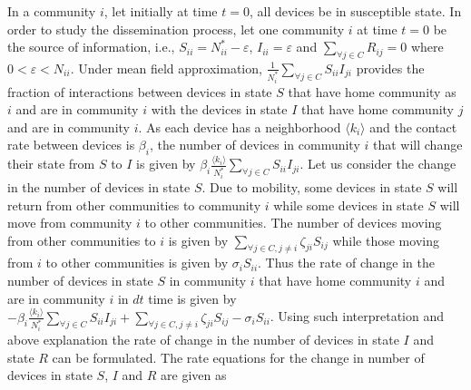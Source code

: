 \documentclass[review]{elsarticle}
\begin{document}
In a community $i$, let initially at time $t=0$, all devices be in susceptible state. In order to study the dissemination process, let one community $i$ at time $t=0$ be the source of information, i.e., $S_{ii}=N_{ii}^{*}-\varepsilon$, $I_{ii}=\varepsilon$ and $\displaystyle \sum_{\forall j\in C}R_{ij}=0$ where $0<\varepsilon<N_{ii}$. Under mean field approximation, $\displaystyle \frac{1}{N_{i}^{*}}\sum_{\forall j \in C}S_{ii}I_{ji}$ provides the fraction of interactions between devices in state $S$ that have home community as $i$ and are in community $i$ with the devices in state $I$ that have home community $j$ and are in community $i$. As each device has a neighborhood $\langle k_{i}\rangle$ and the contact rate between devices is $\beta_i$, the number of devices in community $i$ that will change their state from $S$ to $I$ is given by $\displaystyle \beta_{i}\frac{\langle k_{i} \rangle}{N_{i}^{*}}\sum_{\forall j \in C}S_{ii}I_{ji}$. Let us consider the change in the number of devices in state $S$. Due to mobility, some devices in state $S$ will return from other communities to community $i$ while some devices in state $S$ will move from community $i$ to other communities. The number of devices moving from other communities to $i$ is given by $\displaystyle \sum_{\forall j\in C, j\neq i}\zeta_{ji}S_{ij}$ while those moving from $i$ to other communities is given by $ \sigma_{i}S_{ii}$. Thus the rate of change in the number of devices in state $S$ in community $i$ that have home community $i$ and are in community $i$ in $dt$ time is given by $\displaystyle -\beta_{i}\frac{\langle k_{i} \rangle}{N_{i}^{*}}\sum_{\forall j \in C}S_{ii}I_{ji}+\sum_{\forall j\in C, j\neq i}\zeta_{ji}S_{ij} - \sigma_{i}S_{ii}$. Using such interpretation and above explanation the rate of change in the number of devices in state $I$ and state $R$ can be formulated. The rate equations for the change in number of devices in state $S$, $I$ and $R$ are given as
\end{document}
